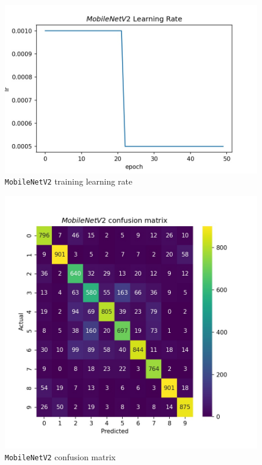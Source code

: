 \documentclass[12pt, letterpaper]{article}
\begin{document}
\begin{figure}[h!]
\includegraphics[width=\linewidth]{history_lr.jpeg}
\caption{\texttt{MobileNetV2} training learning rate}
\label{fig:mobilenetv2-3}
\end{figure}

\begin{figure}[h!]
\includegraphics[width=\linewidth]{confusion_matrix.jpeg}
\caption{\texttt{MobileNetV2} confusion matrix}
\label{fig:mobilenetv2-4}
\end{figure}
\end{document}
